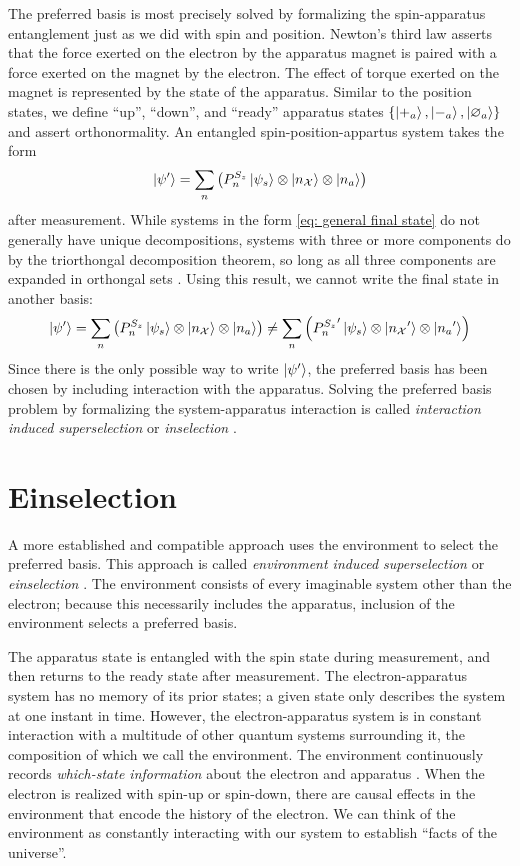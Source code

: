 The preferred basis is most precisely solved by formalizing the spin-apparatus entanglement just as we did with spin and position. Newton's third law asserts that the force exerted on the electron by the apparatus magnet is paired with a force exerted on the magnet by the electron. The effect of torque exerted on the magnet is represented by the state of the apparatus. Similar to the position states, we define ``up'', ``down'', and ``ready'' apparatus states $\{\ket{+_a}, \ket{-_a}, \ket{\varnothing_a}\}$ and assert orthonormality. An entangled spin-position-appartus system takes the form
\begin{align}
  \ket{\psi'} = \sum_{n}\left(P^{S_z}_n\ket{\psi_s} \otimes \ket{n_\mathcal{X}} \otimes \ket{n_a} \right)
\end{align}
after measurement. While systems in the form \autoref{eq: general final state} do not generally have unique decompositions, systems with three or more components do by the triorthongal decomposition theorem, so long as all three components are expanded in orthongal sets \cite{Elby}. Using this result, we cannot write the final state in another basis:
\begin{align}
  \ket{\psi'} = \sum_{n}\left(P^{S_z}_n\ket{\psi_s} \otimes \ket{n_\mathcal{X}} \otimes \ket{n_a} \right) \neq \sum_{n}\left({P^{S_z}_n}'\ket{\psi_s} \otimes \ket{{n_\mathcal{X}}'} \otimes \ket{{n_a}'} \right)
\end{align}
Since there is the only possible way to write $\ket{\psi'}$, the preferred basis has been chosen by including interaction with the apparatus. Solving the preferred basis problem by formalizing the system-apparatus interaction is called \textit{interaction induced superselection} or \textit{inselection} \cite{Wang}.

\section{Einselection}

A more established and compatible approach uses the environment to select the preferred basis. This approach is called \textit{environment induced superselection} or \textit{einselection} \cite{Zurek}. The environment consists of every imaginable system other than the electron; because this necessarily includes the apparatus, inclusion of the environment selects a preferred basis.

The apparatus state is entangled with the spin state during measurement, and then returns to the ready state after measurement. The electron-apparatus system has no memory of its prior states; a given state only describes the system at one instant in time. However, the electron-apparatus system is in constant interaction with a multitude of other quantum systems surrounding it, the composition of which we call the environment. The environment continuously records \textit{which-state information} about the electron and apparatus \cite{Schlosshauer}. When the electron is realized with spin-up or spin-down, there are causal effects in the environment that encode the history of the electron. We can think of the environment as constantly interacting with our system to establish ``facts of the universe''.


